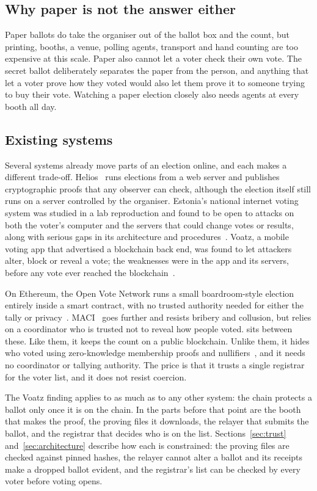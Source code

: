 \subsection{Why paper is not the answer either}

Paper ballots do take the organiser out of the ballot box and the count, but
printing, booths, a venue, polling agents, transport and hand counting are too
expensive at this scale. Paper also cannot let a voter check their own vote.
The secret ballot deliberately separates the paper from the person, and
anything that let a voter prove how they voted would also let them prove it to
someone trying to buy their vote. Watching a paper election closely also needs
agents at every booth all day.

\subsection{Existing systems}

Several systems already move parts of an election online, and each makes a
different trade-off. Helios~\cite{helios} runs elections from a web server and
publishes cryptographic proofs that any observer can check, although the
election itself still runs on a server controlled by the organiser. Estonia's
national internet voting system was studied in a lab reproduction and found to
be open to attacks on both the voter's computer and the servers that could
change votes or results, along with serious gaps in its architecture and
procedures~\cite{estonia}. Voatz, a mobile voting app that advertised a
blockchain back end, was found to let attackers alter, block or reveal a vote;
the weaknesses were in the app and its servers, before any vote ever reached
the blockchain~\cite{voatz}.

On Ethereum, the Open Vote Network runs a small boardroom-style election
entirely inside a smart contract, with no trusted authority needed for either
the tally or privacy~\cite{openvote}. MACI~\cite{maci} goes further and resists
bribery and collusion, but relies on a coordinator who is trusted not to reveal
how people voted. \projectname{} sits between these. Like them, it keeps the
count on a public blockchain. Unlike them, it hides who voted using
zero-knowledge membership proofs and nullifiers~\cite{semaphore}, and it needs
no coordinator or tallying authority. The price is that it trusts a single
registrar for the voter list, and it does not resist coercion.

The Voatz finding applies to \projectname{} as much as to any other system: the
chain protects a ballot only once it is on the chain. In \projectname{} the parts
before that point are the booth that makes the proof,
the proving files it downloads, the relayer that submits the ballot, and the
registrar that decides who is on the list. Sections~\ref{sec:trust}
and~\ref{sec:architecture} describe how each is constrained: the proving files
are checked against pinned hashes, the relayer
cannot alter a ballot and its receipts make a dropped ballot evident, and the
registrar's list can be checked by every voter before voting opens.

